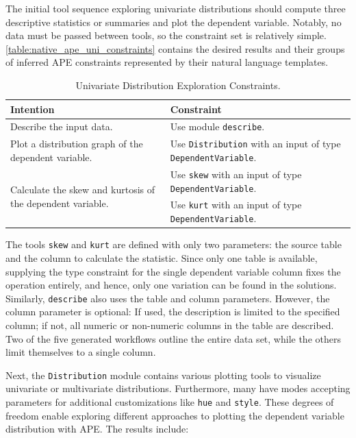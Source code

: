The initial tool sequence exploring univariate distributions should compute three descriptive statistics or summaries and plot the dependent variable. Notably, no data must be passed between tools, so the constraint set is relatively simple. \autoref{table:native_ape_uni_constraints} contains the desired results and their groups of inferred APE constraints represented by their natural language templates.
\begin{table}[h]
\centering
\footnotesize
\begin{tabular}{|p{}|p{}|}
\hline
\textbf{Intention} & \textbf{Constraint} \\
\hline
Describe the input data. & Use module \texttt{describe}. \\
\hline
Plot a distribution graph of the dependent variable. & Use \texttt{Distribution} with an input of type \texttt{DependentVariable}. \\
\hline
\multirow{2}{=}{Calculate the skew and kurtosis of the dependent variable.} & Use \texttt{skew} with an input of type \texttt{DependentVariable}. \\
\cline{2-2}
& Use \texttt{kurt} with an input of type \texttt{DependentVariable}. \\
\hline
\end{tabular}
\caption{Univariate Distribution Exploration Constraints.}
\label{table:native_ape_uni_constraints}
\end{table}

The tools \verb|skew| and \verb|kurt| are defined with only two parameters: the source table and the column to calculate the statistic. Since only one table is available, supplying the type constraint for the single dependent variable column fixes the operation entirely, and hence, only one variation can be found in the solutions. Similarly, \verb|describe| also uses the table and column parameters. However, the column parameter is optional: If used, the description is limited to the specified column; if not, all numeric or non-numeric columns in the table are described. Two of the five generated workflows outline the entire data set, while the others limit themselves to a single column.

Next, the \verb|Distribution| module contains various plotting tools to visualize univariate or multivariate distributions. Furthermore, many have modes accepting parameters for additional customizations like \verb|hue| and \verb|style|. These degrees of freedom enable exploring different approaches to plotting the dependent variable distribution with APE. The results include:


